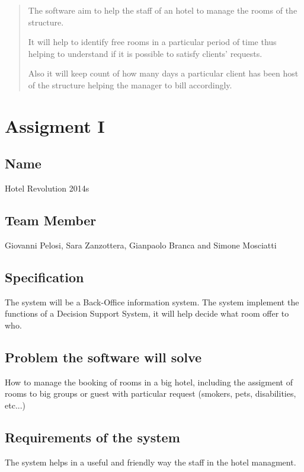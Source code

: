 \begin{abstract}
The software aim to help the staff of an hotel to manage the rooms of the structure.

It will help to identify free rooms in a particular period of time thus helping to understand if it is possible to satisfy clients' requests.

Also it will keep count of how many days a particular client has been host of the structure helping the manager to bill accordingly.
\end{abstract}

\section{Assigment I}

\subsection{Name}
Hotel Revolution 2014s

\subsection{Team Member}
Giovanni Pelosi, Sara Zanzottera, Gianpaolo Branca and Simone Mosciatti

\subsection{Specification}
The system will be a Back-Office information system.
The system implement the functions of a Decision Support System, it will help decide what room offer to who.

\subsection{Problem the software will solve}
How to manage the booking of rooms in a big hotel, including the assigment of rooms to big groups or guest with particular request (smokers, pets, disabilities, etc...)

\subsection{Requirements of the system}
The system helps in a useful and friendly way the staff in the hotel managment.

